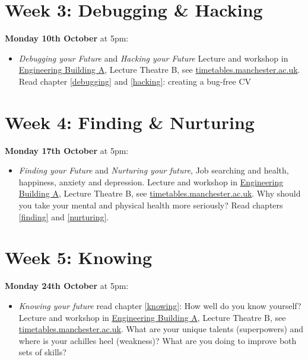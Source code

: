 \documentclass[
]{book}
\providecommand{\tightlist}{%
  \setlength{\itemsep}{0pt}\setlength{\parskip}{0pt}}
\begin{document}
\hypertarget{week3}{%
\section{Week 3: Debugging \& Hacking}\label{week3}}

\textbf{Monday 10th October} at 5pm:

\begin{itemize}
\tightlist
\item
  \emph{Debugging your Future} and \emph{Hacking your Future} Lecture and workshop in \href{https://www.manchester.ac.uk/discover/maps/interactive-map/?id=540}{Engineering Building A}, Lecture Theatre B, see \href{https://timetables.manchester.ac.uk/}{timetables.manchester.ac.uk}. Read chapter \ref{debugging} and \ref{hacking}: creating a bug-free CV
\end{itemize}

\hypertarget{week4}{%
\section{Week 4: Finding \& Nurturing}\label{week4}}

\textbf{Monday 17th October} at 5pm:

\begin{itemize}
\tightlist
\item
  \emph{Finding your Future} and \emph{Nurturing your future}, Job searching and health, happiness, anxiety and depression. Lecture and workshop in \href{https://www.manchester.ac.uk/discover/maps/interactive-map/?id=540}{Engineering Building A}, Lecture Theatre B, see \href{https://timetables.manchester.ac.uk/}{timetables.manchester.ac.uk}. Why should you take your mental and physical health more seriously? Read chapters \ref{finding} and \ref{nurturing}.
\end{itemize}

\hypertarget{week5}{%
\section{Week 5: Knowing}\label{week5}}

\textbf{Monday 24th October} at 5pm:

\begin{itemize}
\tightlist
\item
  \emph{Knowing your future} read chapter \ref{knowing}: How well do you know yourself? Lecture and workshop in \href{https://www.manchester.ac.uk/discover/maps/interactive-map/?id=540}{Engineering Building A}, Lecture Theatre B, see \href{https://timetables.manchester.ac.uk/}{timetables.manchester.ac.uk}. What are your unique talents (superpowers) and where is your achilles heel (weakness)? What are you doing to improve both sets of skills?
\end{itemize}
\end{document}
